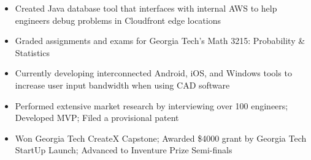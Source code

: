 \documentclass[10pt,letter,ragged2e,withhyper]{altacv}
\begin{document}
\begin{paracol}{2}




\begin{itemize}
\item Created Java database tool that interfaces with internal AWS to help engineers debug problems in Cloudfront edge locations
\end{itemize}

\divider

\begin{itemize}
\item Graded assignments and exams for Georgia Tech’s Math 3215: Probability \& Statistics
\end{itemize}




\begin{itemize}
\item Currently developing interconnected Android, iOS, and Windows tools to increase user input bandwidth when using CAD software
\item Performed extensive market research by interviewing over 100 engineers; Developed MVP; Filed a provisional patent
\item Won Georgia Tech CreateX Capstone; Awarded \$4000 grant by Georgia Tech StartUp Launch; Advanced to Inventure Prize Semi-finals
\end{itemize}


\end{paracol}
\end{document}
